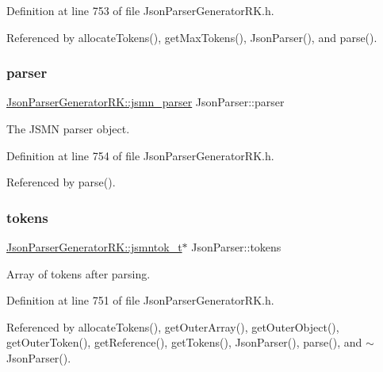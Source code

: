 Definition at line 753 of file Json\+Parser\+Generator\+R\+K.\+h.



Referenced by allocate\+Tokens(), get\+Max\+Tokens(), Json\+Parser(), and parse().

\mbox{\label{class_json_parser_ad8d3dc7a971bd6c8e578518ba6c874f9}} 
\subsubsection{\texorpdfstring{parser}{parser}}
{\footnotesize\ttfamily \hyperlink{struct_json_parser_generator_r_k_1_1jsmn__parser}{Json\+Parser\+Generator\+R\+K\+::jsmn\+\_\+parser} Json\+Parser\+::parser\hspace{0.3cm}{\ttfamily [protected]}}



The J\+S\+MN parser object. 



Definition at line 754 of file Json\+Parser\+Generator\+R\+K.\+h.



Referenced by parse().

\mbox{\label{class_json_parser_af2a9bba1dc92b0c38d0cab6fdad76216}} 
\subsubsection{\texorpdfstring{tokens}{tokens}}
{\footnotesize\ttfamily \hyperlink{struct_json_parser_generator_r_k_1_1jsmntok__t}{Json\+Parser\+Generator\+R\+K\+::jsmntok\+\_\+t}$\ast$ Json\+Parser\+::tokens\hspace{0.3cm}{\ttfamily [protected]}}



Array of tokens after parsing. 



Definition at line 751 of file Json\+Parser\+Generator\+R\+K.\+h.



Referenced by allocate\+Tokens(), get\+Outer\+Array(), get\+Outer\+Object(), get\+Outer\+Token(), get\+Reference(), get\+Tokens(), Json\+Parser(), parse(), and $\sim$\+Json\+Parser().

